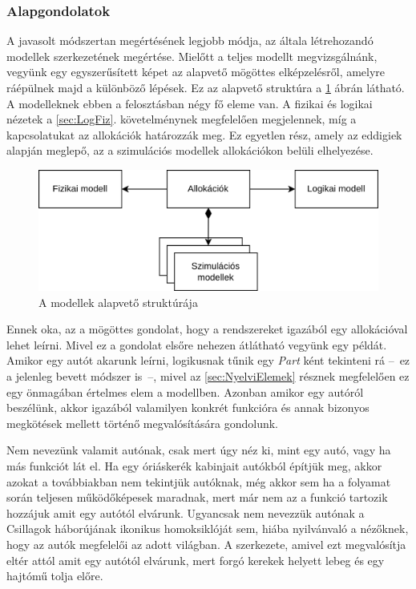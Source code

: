         \subsubsection{Alapgondolatok} \label{sec:Alapgondolatok}
        A javasolt módszertan megértésének legjobb módja, az általa létrehozandó modellek szerkezetének megértése. Mielőtt a teljes modellt megvizsgálnánk, vegyünk egy egyszerűsített képet az alapvető mögöttes elképzelésről, amelyre ráépülnek majd a különböző lépések. Ez az alapvető struktúra a \ref{fig:Alapstruktura} ábrán látható.
        A modelleknek ebben a felosztásban négy fő eleme van. A fizikai és logikai nézetek a \ref{sec:LogFiz}. követelménynek megfelelően megjelennek, míg a kapcsolatukat az allokációk határozzák meg.
        Ez egyetlen rész, amely az eddigiek alapján meglepő, az a szimulációs modellek allokációkon belüli elhelyezése.
        \begin{figure}[!ht]
            \centering
            \includegraphics[width=150mm, keepaspectratio]{figures/Alapelemek.drawio.png}
            \caption{A modellek alapvető struktúrája} 
            \label{fig:Alapstruktura}
        \end{figure}

        Ennek oka, az a mögöttes gondolat, hogy a rendszereket igazából egy allokációval lehet leírni. Mivel ez a gondolat elsőre nehezen átlátható vegyünk egy példát.
        Amikor egy autót akarunk leírni, logikusnak tűnik egy \emph{Part} ként tekinteni rá --~ez a jelenleg bevett módszer is~--, mivel az \ref{sec:NyelviElemek} résznek megfelelően ez egy önmagában értelmes elem a modellben.
        Azonban amikor egy autóról beszélünk, akkor igazából valamilyen konkrét funkcióra és annak bizonyos megkötések mellett történő megvalósítására gondolunk.
        
        Nem nevezünk valamit autónak, csak mert úgy néz ki, mint egy autó, vagy ha más funkciót lát el. Ha egy óriáskerék kabinjait autókból építjük meg, akkor azokat a továbbiakban nem tekintjük autóknak, még akkor sem ha a folyamat során teljesen működőképesek maradnak, mert már nem az a funkció tartozik hozzájuk amit egy autótól elvárunk.
        Ugyancsak nem nevezzük autónak a Csillagok háborújának ikonikus homoksiklóját sem, hiába nyilvánvaló a nézőknek, hogy az autók megfelelői az adott világban. A szerkezete, amivel ezt megvalósítja eltér attól amit egy autótól elvárunk, mert forgó kerekek helyett lebeg és egy hajtómű tolja előre.

